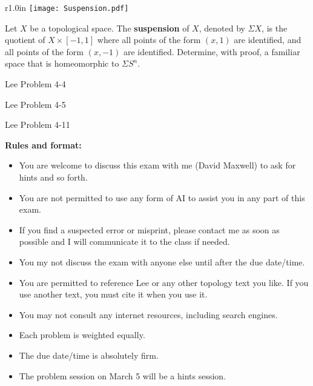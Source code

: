 \documentclass{homework651}
\begin{document}
\begin{problems}
\begin{wrapfigure}{r}{1.0in}
    \vskip-0.5cm
    \texttt{[image: Suspension.pdf]}
    \end{wrapfigure}
    \problem
    Let $X$ be a topological space.  The {\bf suspension} of $X$, denoted by
    $\Sigma X$, is the quotient of $X\times [-1,1]$ where all points of the form $(x,1)$
    are identified, and all points of the form $(x,-1)$ are identified.  
    Determine, with proof, a familiar space that is homeomorphic to $\Sigma S^n$.
    
\problem Lee Problem 4-4

\problem Lee Problem 4-5

\problem Lee Problem 4-11

\newpage
{\bf  Rules and format:}
\begin{itemize}

\item You are welcome to discuss this exam with me (David Maxwell) to ask for hints and so forth.
\item You are not permitted to use any form of AI to assist you in any part of this exam.
\item  If you find a suspected error or misprint, please contact me as soon as possible and I will
communicate it to the class if needed.
\item You my not discuss the exam with anyone else until after the due date/time.
\item You are permitted to reference Lee or any other topology text you like.  If you use
another text, you must cite it when you use it.
\item You may not consult any internet resources, including search engines.
\item Each problem is weighted equally.
\item The due date/time is absolutely firm.
\item The problem session on March 5 will be a hints session.
\end{itemize}

\end{problems}
\end{document}
